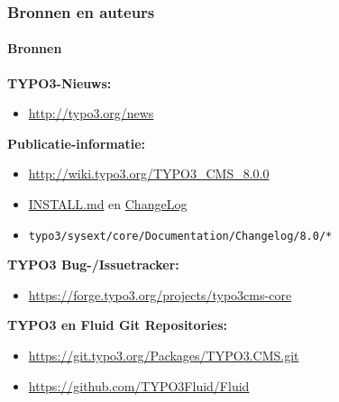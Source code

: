 \begin{frame}[fragile]
	\frametitle{Bronnen en auteurs}
	\framesubtitle{Bronnen}

	\textbf{TYPO3-Nieuws:}
		\begin{itemize}\smaller
			\item \url{http://typo3.org/news}
		\end{itemize}

	\textbf{Publicatie-informatie:}
		\begin{itemize}\smaller
			\item \url{http://wiki.typo3.org/TYPO3_CMS_8.0.0}
			\item \href{https://github.com/TYPO3/TYPO3.CMS/blob/master/INSTALL.md}{INSTALL.md} en \href{https://github.com/TYPO3/TYPO3.CMS/tree/master/typo3/sysext/core/Documentation/Changelog}{ChangeLog}
			\item \texttt{typo3/sysext/core/Documentation/Changelog/8.0/*}
		\end{itemize}

	\textbf{TYPO3 Bug-/Issuetracker:}
		\begin{itemize}\smaller
			\item \url{https://forge.typo3.org/projects/typo3cms-core}
		\end{itemize}

	\textbf{TYPO3 en Fluid Git Repositories:}
		\begin{itemize}\smaller
			\item \url{https://git.typo3.org/Packages/TYPO3.CMS.git}
			\item \url{https://github.com/TYPO3Fluid/Fluid}
		\end{itemize}

\end{frame}



